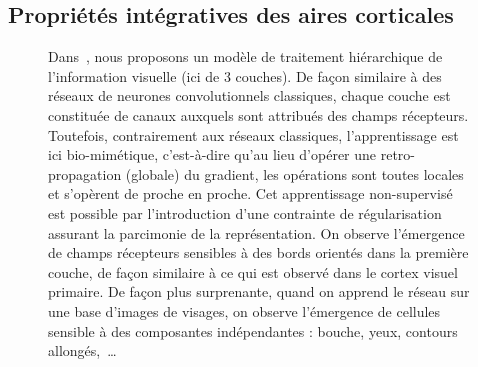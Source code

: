 \subsection{Propriétés intégratives des aires corticales}
\begin{figure}%
\caption{
Dans~\citep{BoutinFranciosiniChavaneRuffierPerrinet20}, nous proposons un
modèle de traitement hiérarchique de l'information visuelle (ici de 3 couches).
De façon similaire à des réseaux de neurones convolutionnels classiques,
chaque couche est constituée de canaux auxquels sont attribués des champs récepteurs.
Toutefois, contrairement aux réseaux classiques, l'apprentissage est ici bio-mimétique,
c'est-à-dire qu'au lieu d'opérer une retro-propagation (globale) du gradient,
les opérations sont toutes locales et s'opèrent de proche en proche.
Cet apprentissage non-supervisé est possible par l'introduction
d'une contrainte de régularisation assurant la parcimonie de la représentation.
On observe l'émergence de champs récepteurs sensibles à des bords orientés dans la première couche,
de façon similaire à ce qui est observé dans le cortex visuel primaire.
De façon plus surprenante, quand on apprend le réseau sur une base d'images de visages,
on observe l'émergence de cellules sensible à des composantes indépendantes : bouche, yeux, contours allongés,~\ldots
}
\label{fig:BoutinFranciosiniChavaneRuffierPerrinet19}
\end{figure}
